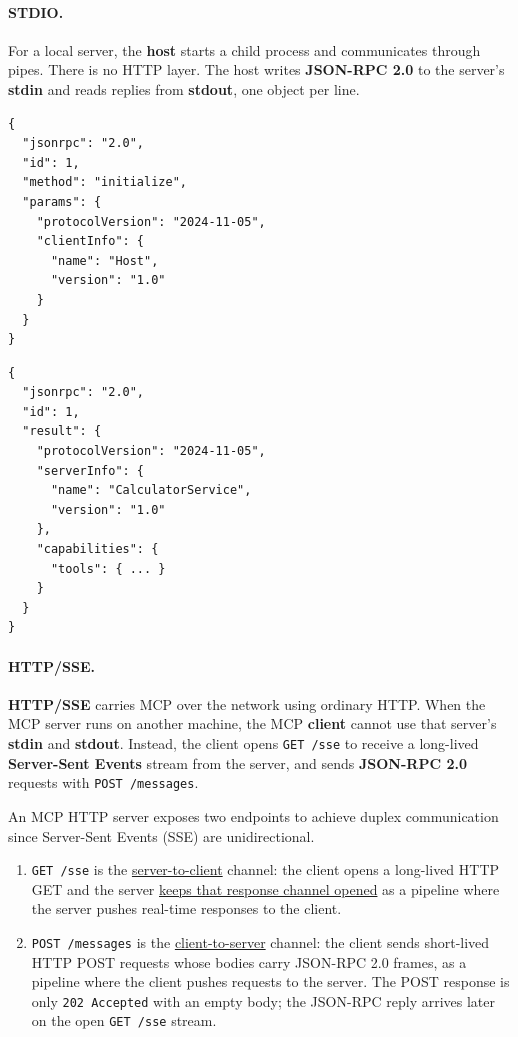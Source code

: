 \paragraph{STDIO.}
For a local server, the \textbf{host} starts a child process and communicates through pipes.
There is no HTTP layer.
The host writes \textbf{JSON-RPC 2.0} to the server's \textbf{stdin} and reads replies from \textbf{stdout}, one object per line.

\begin{httpexchange}
\begin{lstlisting}[style=json]
{
  "jsonrpc": "2.0",
  "id": 1,
  "method": "initialize",
  "params": {
    "protocolVersion": "2024-11-05",
    "clientInfo": {
      "name": "Host",
      "version": "1.0"
    }
  }
}
\end{lstlisting}
\httpmidarrows
\begin{lstlisting}[style=json]
{
  "jsonrpc": "2.0",
  "id": 1,
  "result": {
    "protocolVersion": "2024-11-05",
    "serverInfo": {
      "name": "CalculatorService", 
      "version": "1.0"
    },
    "capabilities": {
      "tools": { ... }
    }
  }
}
\end{lstlisting}
\end{httpexchange}

\paragraph{HTTP/SSE.}
\textbf{HTTP/SSE} carries MCP over the network using ordinary HTTP.
When the MCP server runs on another machine, the MCP \textbf{client} 
cannot use that server's \textbf{stdin} and \textbf{stdout}.
Instead, the client opens \texttt{GET /sse} to receive a long-lived 
\textbf{Server-Sent Events} stream from the server, 
and sends \textbf{JSON-RPC 2.0} requests with \texttt{POST /messages}.

An MCP HTTP server exposes two endpoints to achieve duplex communication 
since Server-Sent Events (SSE) are unidirectional.
\begin{enumerate}
  \item \texttt{GET /sse} is the \uline{server-to-client} channel: 
  the client opens a long-lived HTTP GET and the server \uline{keeps that response channel opened} 
  as a pipeline where the server pushes real-time responses to the client.
  \item \texttt{POST /messages} is the \uline{client-to-server} channel:
  the client sends short-lived HTTP POST requests whose bodies carry JSON-RPC 2.0 frames,
  as a pipeline where the client pushes requests to the server.
  The POST response is only \texttt{202 Accepted} with an empty body; the JSON-RPC reply arrives later on the open \texttt{GET /sse} stream.
\end{enumerate}


